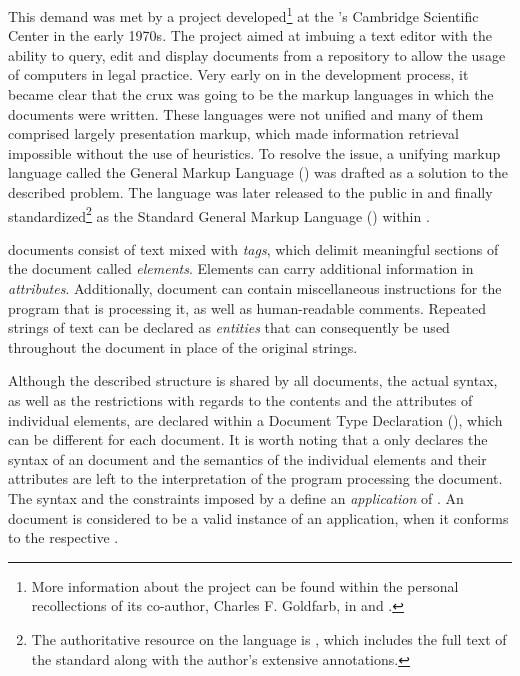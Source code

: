 \documentclass{book}
\begin{document}
        This demand was met by a project developed\footnote{
          More information about the project can be found within the personal
          recollections of its co-author, Charles F. Goldfarb, in
          \cite{goldfarb96} and \cite{goldfarb97:whySGML}.
        } at the 's Cambridge Scientific Center in the early 1970s.
        The project aimed at imbuing a text editor with the ability to query,
        edit and display documents from a repository to allow the usage of
        computers in legal practice. Very early on in the development process,
        it became clear that the crux was going to be the markup languages in
        which the documents were written. These languages were not unified and
        many of them comprised largely presentation markup, which made
        information retrieval impossible without the use of heuristics. To
        resolve the issue, a unifying markup language called the General Markup
        Language () was drafted as a solution to the described
        problem. The language was later released to the public in
        \cite{goldfarb81} and finally standardized\footnote{
          The authoritative resource on the  language is
          \cite{goldfarb91}, which includes the full text of the standard along
          with the author's extensive annotations.
        } as the Standard General Markup Language () within
        \cite{iso8879}.

         documents consist of text mixed with \emph{tags}, which
        delimit meaningful sections of the document called \emph{elements}.
        Elements can carry additional information in \emph{attributes}.
        Additionally,  document can contain miscellaneous
        instructions for the program that is processing it, as well as
        human-readable comments. Repeated strings of text can be declared as
        \emph{entities} that can consequently be used throughout the document in
        place of the original strings.
        
        Although the described structure is shared by all 
        documents, the actual syntax, as well as the restrictions with regards
        to the contents and the attributes of individual elements, are declared
        within a Document Type Declaration (), which can be
        different for each document. It is worth noting that a 
        only declares the syntax of an  document and the semantics
        of the individual elements and their attributes are left to the
        interpretation of the program processing the document. The syntax and
        the constraints imposed by a  define an \emph{application}
        of . An  document is considered to be a
        valid instance of an  application, when it conforms to the
        respective .
\end{document}
